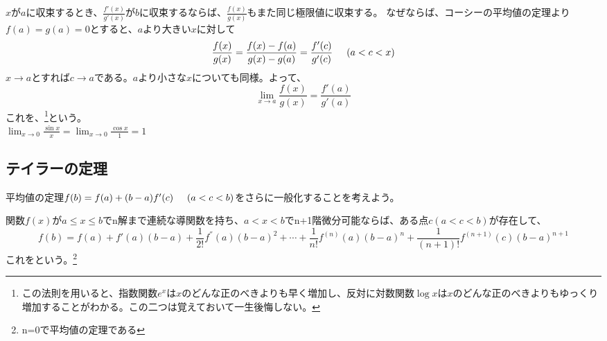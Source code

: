 \documentclass[a4j,dvipdfmx]{jsarticle}
\begin{document}
$x$が$a$に収束するとき、$\frac{f'(x)}{g'(x)}$が$b$に収束するならば、$\frac{f(x)}{g(x)}$もまた同じ極限値に収束する。
なぜならば、コーシーの平均値の定理より$f(a)=g(a)=0$とすると、$a$より大きい$x$に対して
\begin{equation*}
    \frac{f(x)}{g(x)}=\frac{f(x)-f(a)}{g(x)-g(a)}=\frac{f'(c)}{g'(c)}\hspace{5mm}(a<c<x)
\end{equation*}
$x\to a$とすれば$c\to a$である。$a$より小さな$x$についても同様。よって、
\begin{equation}
    \lim_{x\to a}\frac{f(x)}{g(x)}=\frac{f'(a)}{g'(a)}
\end{equation}
これを、\footnote{この法則を用いると、指数関数$e^x$は$x$のどんな正のべきよりも早く増加し、反対に対数関数$\log x$は$x$のどんな正のべきよりもゆっくり増加することがわかる。この二つは覚えておいて一生後悔しない。}という。\\
$\lim_{x\to 0}\frac{\sin x}{x}=\lim_{x\to 0}\frac{\cos x}{1}=1$
\newpage
\subsection{テイラーの定理}
平均値の定理$f(b)=f(a)+(b-a)f'(c)\hspace{5mm}(a<c<b)$をさらに一般化することを考えよう。

関数$f(x)$が$a\leq x\leq b$でn解まで連続な導関数を持ち、$a<x<b$でn+1階微分可能ならば、ある点$c(a<c<b)$が存在して、
\begin{equation}
    f(b)=f(a)+f'(a)(b-a)+\frac{1}{2!}f^{''}(a)(b-a)^2+\cdots+\frac{1}{n!}f^{(n)}(a)(b-a)^n+\frac{1}{(n+1)!}f^{(n+1)}(c)(b-a)^{n+1}
\end{equation}
これをという。\footnote{n=0で平均値の定理である}
\end{document}
